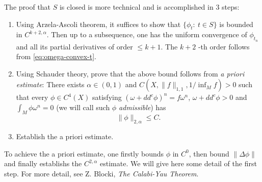 \documentclass[11pt]{article}
\begin{document}
The proof that \(S\) is closed is more technical and is accomplished in 3 steps:
\begin{enumerate}
\item Using Arzela-Ascoli theorem, it suffices to show that \(\{\phi_t:\ t\in S\}\) is bounded in
\(C^{k+2,\alpha}\). Then up to a subsequence, one has the uniform convergence of \(\phi_{t_n}\)
and all its partial derivatives of order \(\leq k+1\). The \(k+2\) -th order follows from \eqref{eq:omega-convex-t}.
\item Using Schauder theory, prove that the above bound follows from \emph{a priori estimate}: \newline There exists
\(\alpha\in (0,1)\) and \(C(X,\|f\|_{1,1}, 1/\inf_M f)>0\) such that every \(\phi\in C^4(X)\)
satisfying \((\omega +dd^c\phi)^n = f\omega^n\), \(\omega + dd^c\phi >0\) and \(\int_M \phi\omega^n=0\)
(we will call such \(\phi\) \emph{admissible})
has \[\|
   \phi\|_{2,\alpha} \leq C.\]
\item Establish the a priori estimate.
\end{enumerate}

To achieve the a priori estimate, one firstly bounds \(\phi\) in \(C^0\), then bound \(\| \Delta\phi\|\)
and finally establishs the \(C^{2,\alpha}\) estimate. We will give here some detail of the first
step. For more detail, see Z. Blocki, \emph{The Calabi-Yau Theorem}.
\end{document}
